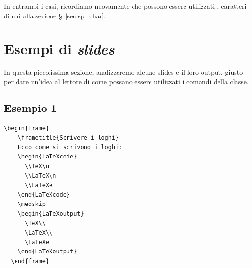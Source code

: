 \documentclass[a4paper,10pt]{article}
\begin{document}
In entrambi i casi, ricordiamo nuovamente che possono essere
utilizzati i caratteri di cui alla sezione \S~\ref{sec:sp_char}.


\newpage
\section{Esempi di \textit{slides}}
In questa piccolissima sezione, analizzeremo alcune slides e il loro
output, giusto per dare un'idea al lettore di come possano essere
utilizzati i comandi della classe.

\subsection*{Esempio 1}\label{ex1}

\begin{Verbatim}[gobble=2]
  \begin{frame}
    \frametitle{Scrivere i loghi}
    Ecco come si scrivono i loghi:
    \begin{LaTeXcode}
      \\TeX\n
      \\LaTeX\n
      \\LaTeXe
    \end{LaTeXcode}
    \medskip
    \begin{LaTeXoutput}
      \TeX\\
      \LaTeX\\
      \LaTeXe
    \end{LaTeXoutput}
  \end{frame}
\end{Verbatim}

\bigskip
\begin{center}
\end{center}
\end{document}
